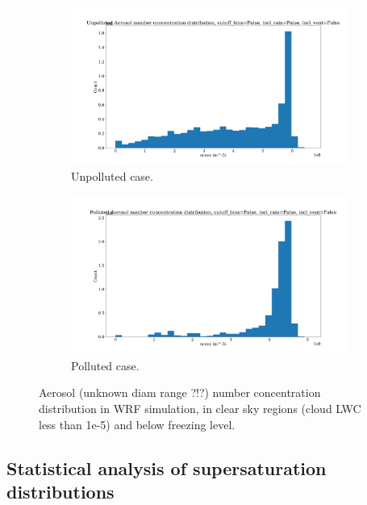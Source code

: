 \documentclass{article}
\begin{document}
\begin{figure}[ht]
	\centering
	\begin{subfigure}{0.7\textwidth}
		\includegraphics[width=\textwidth]{revmywrf/v1_aero_nconc_hist_Unpolluted_figure.png}
		\caption{Unpolluted case.}
		\label{wrfaeronconchistunpoll}
	\end{subfigure}
	\begin{subfigure}{0.7\textwidth}
		\includegraphics[width=\textwidth]{revmywrf/v1_aero_nconc_hist_Polluted_figure.png}
		\caption{Polluted case.}
		\label{wrfaeronconchistpoll}
	\end{subfigure}
	\caption{Aerosol (unknown diam range ?!?) number concentration distribution in WRF simulation, in clear sky regions (cloud LWC less than 1e-5) and below freezing level.}
	\label{wrfaeronconchist}
\end{figure}

\subsection{Statistical analysis of supersaturation distributions}
\end{document}
